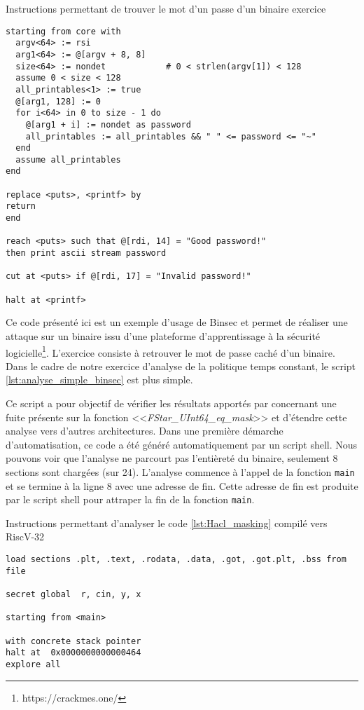 \begin{listing}[!ht]
    \caption{Instructions permettant de trouver le mot d'un passe d'un binaire exercice}
    \label{lst:exemple_binsec}
    \begin{verbatim}
starting from core with
  argv<64> := rsi
  arg1<64> := @[argv + 8, 8]
  size<64> := nondet            # 0 < strlen(argv[1]) < 128
  assume 0 < size < 128
  all_printables<1> := true
  @[arg1, 128] := 0
  for i<64> in 0 to size - 1 do
    @[arg1 + i] := nondet as password
    all_printables := all_printables && " " <= password <= "~"
  end
  assume all_printables
end

replace <puts>, <printf> by
return
end

reach <puts> such that @[rdi, 14] = "Good password!"
then print ascii stream password

cut at <puts> if @[rdi, 17] = "Invalid password!"

halt at <printf>
\end{verbatim}
\end{listing}

Ce code présenté ici est un exemple d'usage de Binsec et permet de réaliser une attaque sur un binaire issu d'une plateforme d'apprentissage à la sécurité logicielle\footnote{https://crackmes.one/}. L'exercice consiste à retrouver le mot de passe caché d'un binaire. Dans le cadre de notre exercice d'analyse de la politique temps constant, le script \ref{lst:analyse_simple_binsec} est plus simple.\medbreak

Ce script a pour objectif de vérifier les résultats apportés par \cite{schneider2024breakingbadcompilersbreak} concernant une fuite présente sur la fonction <<\textit{FStar\_UInt64\_eq\_mask}>> et d'étendre cette analyse vers d'autres architectures. Dans une première démarche d'automatisation, ce code a été généré automatiquement par un script shell. Nous pouvons voir que l'analyse ne parcourt pas l'entièreté du binaire, seulement 8 sections sont chargées (sur 24). L'analyse commence à l'appel de la fonction \texttt{main} et se termine à la ligne 8 avec une adresse de fin. Cette adresse de fin est produite par le script shell pour attraper la fin de la fonction \texttt{main}. 

\begin{listing}[!ht]
    \caption{Instructions permettant d'analyser le code \ref{lst:Hacl_masking} compilé vers RiscV-32}
    \label{lst:analyse_simple_binsec}
    \begin{verbatim}
load sections .plt, .text, .rodata, .data, .got, .got.plt, .bss from file

secret global  r, cin, y, x

starting from <main>

with concrete stack pointer
halt at  0x0000000000000464
explore all

\end{verbatim}
\end{listing}


